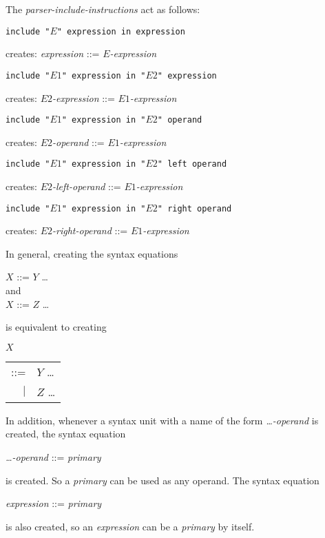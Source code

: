 \documentclass[12pt]{article}
\newenvironment{indpar}[1][0.3in]%
	{\begin{list}{}%
		     {\setlength{\itemsep}{0in}%
		      \setlength{\topsep}{0in}%
		      \setlength{\parsep}{1ex}%
		      \setlength{\labelwidth}{#1}%
		      \setlength{\leftmargin}{#1}%
		      \addtolength{\leftmargin}{\labelsep}}%
	 \item}%
	{\end{list}}
\begin{document}
\begin{indpar}
\end{indpar}

The {\em parser-include-instructions} act as follows:

\begin{indpar}

{\tt include "$E$" expression in expression}
\begin{indpar}
creates: {\em expression} ::= {\em $E$-expression}
\end{indpar}

{\tt include "$E1$" expression in "$E2$" expression}
\begin{indpar}
creates: {\em $E2$-expression} ::= {\em $E1$-expression}
\end{indpar}

{\tt include "$E1$" expression in "$E2$" operand}
\begin{indpar}
creates: {\em $E2$-operand} ::= {\em $E1$-expression}
\end{indpar}

{\tt include "$E1$" expression in "$E2$" left operand}
\begin{indpar}
creates: {\em $E2$-left-operand} ::= {\em $E1$-expression}
\end{indpar}

{\tt include "$E1$" expression in "$E2$" right operand}
\begin{indpar}
creates: {\em $E2$-right-operand} ::= {\em $E1$-expression}
\end{indpar}

\end{indpar}

In general, creating the syntax equations
\begin{center}
$X$ ::= $Y$ \ldots \\
and \\
$X$ ::= $Z$ \ldots \\
\end{center}
is equivalent to creating
\begin{center}
$X$ \begin{tabular}[t]{rl}
    ::= & $Y$ \ldots \\
    $|$ & $Z$ \ldots \\
    \end{tabular}
\end{center}

In addition, whenever a syntax unit with a name of the
form {\em \ldots-operand} is created, the syntax equation
\begin{center}
{\em \ldots-operand} ::= {\em primary}
\end{center}
is created.  So a {\em primary} can be used as any operand.
The syntax equation
\begin{center}
{\em expression} ::= {\em primary}
\end{center}
is also created, so an {\em expression} can be a {\em primary} by itself.
\end{document}
